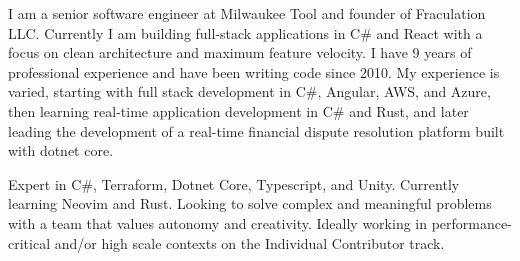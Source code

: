 

\begin{cvparagraph}

I am a senior software engineer at Milwaukee Tool and founder of Fraculation LLC.\@
Currently I am building full-stack applications in C\# and React with a focus on clean architecture and maximum feature velocity.
I have 9 years of professional experience and have been writing code since 2010. My experience is varied, starting with 
full stack development in C\#, Angular, AWS, and Azure, then learning real-time application development in C\# and Rust,
and later leading the development of a real-time financial dispute resolution platform built with dotnet core.

Expert in C\#, Terraform, Dotnet Core, Typescript, and Unity. Currently learning Neovim and Rust. 
Looking to solve complex and meaningful problems with a team that values autonomy and creativity.
Ideally working in performance-critical and/or high scale contexts on the Individual Contributor track.


\end{cvparagraph}
